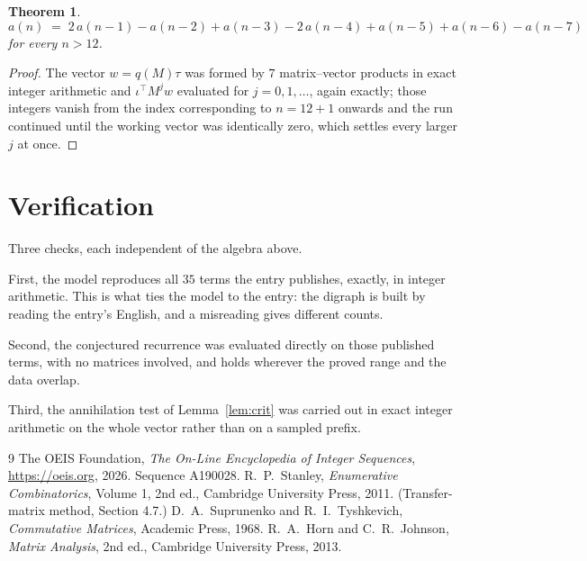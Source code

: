\documentclass[11pt,a4paper]{article}
\theoremstyle{plain}
\newtheorem{theorem}{Theorem}
\theoremstyle{definition}
\begin{document}
\begin{theorem}
\[
a(n)\;=\;2\,a(n-1) - a(n-2) + a(n-3) - 2\,a(n-4) + a(n-5) + a(n-6) - a(n-7)
\]
for every $n>12$.
\end{theorem}

\begin{proof}
The vector $w=q(M)\tau$ was formed by $7$ matrix--vector products in exact integer
arithmetic and $\iota^{\!\top}M^{j}w$ evaluated for $j=0,1,\dots$, again exactly; those
integers vanish from the index corresponding to $n=12+1$ onwards and the run continued
until the working vector was identically zero, which settles every larger $j$ at once.
\end{proof}

\section{Verification}

Three checks, each independent of the algebra above.

First, the model reproduces all $35$ terms the entry publishes, exactly, in integer
arithmetic. This is what ties the model to the entry: the digraph is built by reading the
entry's English, and a misreading gives different counts.

Second, the conjectured recurrence was evaluated directly on those published terms, with no
matrices involved, and holds wherever the proved range and the data overlap.

Third, the annihilation test of Lemma~\ref{lem:crit} was carried out in exact integer
arithmetic on the whole vector rather than on a sampled prefix.

\begin{thebibliography}{9}
 The OEIS Foundation, \emph{The On-Line Encyclopedia of Integer
Sequences}, \url{https://oeis.org}, 2026. Sequence A190028.
 R.~P.~Stanley, \emph{Enumerative Combinatorics}, Volume 1, 2nd ed.,
Cambridge University Press, 2011. (Transfer-matrix method, Section 4.7.)
 D.~A.~Suprunenko and R.~I.~Tyshkevich, \emph{Commutative Matrices},
Academic Press, 1968.
 R.~A.~Horn and C.~R.~Johnson, \emph{Matrix Analysis}, 2nd ed., Cambridge
University Press, 2013.
\end{thebibliography}
\end{document}
